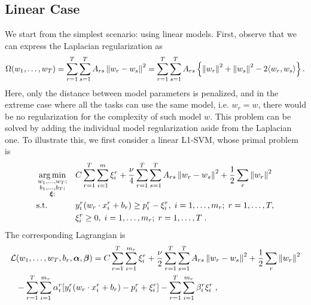 \subsection{Linear Case}
We start from the simplest scenario: using linear models. First, observe that we can express the Laplacian regularization as
\begin{equation}
    \nonumber
    \Omega(w_1, \ldots, w_T) = \sum_{r=1}^T \sum_{s=1}^T A_{rs} \left\lVert w_r - w_s\right\rVert^2 =  \sum_{r=1}^T \sum_{s=1}^T A_{rs} \left\{ \left\lVert w_r\right\rVert^2 + \left\lVert w_s\right\rVert^2 - 2 \langle w_r, w_s \rangle \right\}.
\end{equation}
Here, only the distance between model parameters is penalized, and in the extreme case where all the tasks can use the same model, i.e. $w_r = w$, there would be no regularization for the complexity of such model $w$.
This problem can be solved by adding the individual model regularization aside from the Laplacian one.
To illustrate this, we first consider a linear L1-SVM, whose primal problem is
\begin{equation}\label{eq:linear_gl_primal}
\begin{aligned}
& \argmin_{\substack{w_1, \ldots, w_\ntasks ; \\ \substack{b_1, \ldots, b_\ntasks } ; \\ \substack{\fv{\xi}}; }}
& & {C \sum_{r=1}^T \sum_{i=1}^m{\xi_{i}^r} + \frac{\nu}{4} \sum_{r=1}^T \sum_{s=1}^T A_{rs} \norm{w_r - w_s}^2 + \frac{1}{2} \sum_r \norm{w_r}^2 }\\
& \text{s.t.}
& & y_{i}^r ( w_r \cdot x_{i}^r + b_r) \geq p_{i}^r - \xi_{i}^r , \;  i=1,\ldots,m_r; \;  r=1,\ldots,T,\\
& & & \xi_{i}^r \geq 0, \;  i=1,\ldots,m_r; \;  r=1,\ldots,T \; .
\end{aligned}
\end{equation}
The corresponding Lagrangian is
\begin{equation}\label{eq:svmmtl_lagr_GL_addreg}
\begin{aligned}
        \mathcal{L}&(w_1, \ldots, w_\ntasks, b_r, \fv{\alpha}, \fv{\beta}) = C \sum_{r=1}^T \sum_{i=1}^{m_r}{\xi_{i}^r} + \frac{\nu}{2} \sum_{r=1}^T \sum_{s=1}^T A_{rs} \norm{w_r - w_s}^2 + \frac{1}{2} \sum_r \norm{w_r}^2 \\
        & - \sum_{r=1}^T \sum_{i=1}^{m_r}{ \alpha_i^r [y_{i}^r (w_r \cdot x_{i}^r + b_r) - p_{i}^r + \xi_{i}^r]   } - \sum_{r=1}^T \sum_{i=1}^{m_r}{ \beta_i^r \xi_i^r } \; ,
\end{aligned}
\end{equation}
